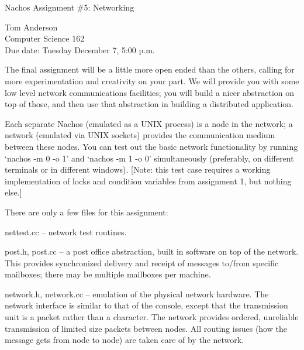 

\begin{center}
{\large Nachos Assignment \#5: Networking

\vspace{.2in}
Tom Anderson\\
Computer Science 162\\
Due date: Tuesday December 7, 5:00 p.m.
}
\end{center}

\vspace{.2in}

The final assignment will be a little more open ended than the others,
calling for more experimentation and creativity on your part.
We will provide you with some low level network communications facilities;
you will build a nicer abstraction on top of those, and then use
that abstraction in building a distributed application.

Each separate Nachos (emulated as a UNIX process) is a node in the network;
a network (emulated via UNIX sockets) provides the communication medium
between these nodes.  You can test out the basic network functionality
by running `nachos -m 0 -o 1' and `nachos -m 1 -o 0' simultaneously
(preferably, on different terminals or in different windows).
[Note: this test case requires a working implementation of locks
and condition variables from assignment 1, but nothing else.]

There are only a few files for this assignment:

\begin{description}

\item nettest.cc -- network test routines.

\item post.h, post.cc -- a post office abstraction, built in software
on top of the network.  This provides synchronized delivery and
receipt of messages to/from specific mailboxes; there may be multiple
mailboxes per machine.

\item network.h, network.cc -- emulation of the physical network hardware.
The network interface is similar to that of the console, except
that the transmission unit is a packet rather than a character.
The network provides ordered, unreliable transmission of limited
size packets between nodes.  All routing issues (how the message
gets from node to node) are taken care of by the network.

\end{description}

